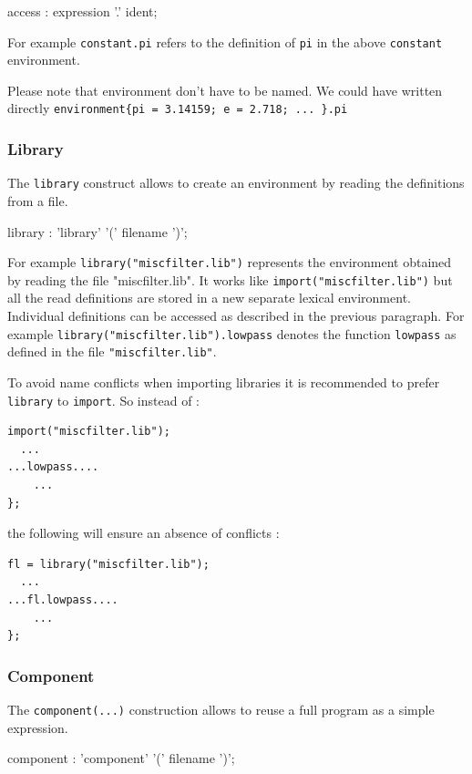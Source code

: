 \begin{rail}
access :    expression '.' ident;       
\end{rail}

For example \lstinline'constant.pi' refers to the definition of \lstinline'pi' in the above \lstinline'constant' environment.

Please note that environment don't have to be named. We could have written directly 
\lstinline'environment{pi = 3.14159; e = 2.718; ... }.pi'

\subsubsection{Library} 
The \lstinline'library' construct allows to create an environment by reading the definitions from a file.

\begin{rail}
library :    'library' '(' filename ')';
\end{rail}

For example \lstinline'library("miscfilter.lib")' represents the environment 
obtained by reading the file "miscfilter.lib". It works like \lstinline'import("miscfilter.lib")' but all the read definitions are stored in a new separate lexical environment. Individual definitions can be accessed as described in the previous paragraph. For example \lstinline'library("miscfilter.lib").lowpass' denotes the function \lstinline'lowpass' as defined in the file \lstinline'"miscfilter.lib"'.

To avoid name conflicts when importing libraries it is recommended to prefer \lstinline'library' to \lstinline'import'. So instead of :

\begin{lstlisting}
import("miscfilter.lib");
  ...
...lowpass....
	...
};
\end{lstlisting}
the following will ensure an absence of conflicts : 
\begin{lstlisting}
fl = library("miscfilter.lib");
  ...
...fl.lowpass....
	...
};
\end{lstlisting}

\subsubsection{Component} 
The \lstinline'component(...)' construction allows to reuse a full \faust program as a simple expression.

\begin{rail}
component :    'component' '(' filename ')';
\end{rail}

